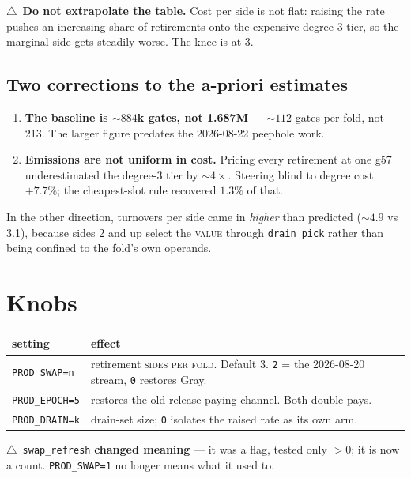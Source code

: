 \documentclass[11pt]{article}
\begin{document}
\medskip\noindent
$\triangle$~\textbf{Do not extrapolate the table.} Cost per side is not flat:
raising the rate pushes an increasing share of retirements onto the expensive
degree-3 tier, so the marginal side gets steadily worse. The knee is at 3.

\subsection*{Two corrections to the a-priori estimates}

\begin{enumerate}
\item \textbf{The baseline is ${\sim}884$k gates, not 1.687M} --- ${\sim}112$
gates per fold, not 213. The larger figure predates the 2026-08-22 peephole
work.
\item \textbf{Emissions are not uniform in cost.} Pricing every retirement at
one g57 underestimated the degree-3 tier by ${\sim}4\times$. Steering blind to
degree cost $+7.7\%$; the cheapest-slot rule recovered $1.3\%$ of that.
\end{enumerate}

\noindent In the other direction, turnovers per side came in \emph{higher} than
predicted (${\sim}4.9$ vs 3.1), because sides 2 and up select the
\textsc{value} through \texttt{drain\_pick} rather than being confined to the
fold's own operands.

\section{Knobs}

\begin{center}
\begin{tabular}{ll}
\toprule
setting & effect \\
\midrule
\texttt{PROD\_SWAP=n} & retirement \textsc{sides per fold}. Default 3.
  \texttt{2} = the 2026-08-20 stream, \texttt{0} restores Gray. \\
\texttt{PROD\_EPOCH=5} & restores the old release-paying channel. Both
  double-pays. \\
\texttt{PROD\_DRAIN=k} & drain-set size; \texttt{0} isolates the raised rate
  as its own arm. \\
\bottomrule
\end{tabular}
\end{center}

\noindent
$\triangle$~\texttt{swap\_refresh} \textbf{changed meaning} --- it was a flag,
tested only $>0$; it is now a count. \texttt{PROD\_SWAP=1} no longer means what
it used to.
\end{document}
